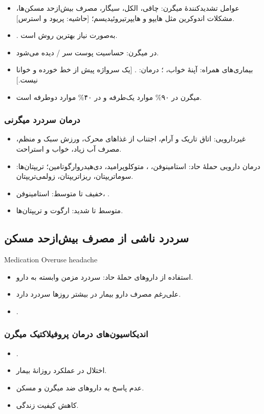 \begin{itemize}
\item عوامل تشدیدکنندهٔ میگرن: چاقی، الکل، سیگار، مصرف بیش‌ازحد مسکن‌ها، مشکلات اندوکرین مثل هایپو و هایپرتیروئیدیسم؛ [حاشیه: پریود و استرس].
\item {}. به‌صورت نیاز بهترین روش  است.
\item در میگرن: حساسیت پوست سر /  دیده می‌شود.
\item بیماری‌های همراه: آپنهٔ خواب، ؛ درمان: . [یک سرواژه پیش از  خط خورده و خوانا نیست.]
\item میگرن در ۹۰\% موارد یک‌طرفه و در ۴۰\% موارد دوطرفه است.
\end{itemize}
\subsubsection{درمان سردرد میگرنی}
\begin{itemize}
\item غیردارویی: اتاق تاریک و آرام، اجتناب از غذاهای محرک، ورزش سبک و منظم، مصرف آب زیاد، خواب و استراحت.
\item درمان دارویی حملهٔ حاد: استامینوفن، ، متوکلوپرامید، دی‌هیدروارگوتامین؛ تریپتان‌ها: سوماتریپتان، ریزاتریپتان، زولمی‌تریپتان.
\item خفیف تا متوسط: استامینوفن، .
\item متوسط تا شدید: ارگوت و تریپتان‌ها.
\end{itemize}
\subsection{سردرد ناشی از مصرف بیش‌ازحد مسکن}
\begin{latin}\noindent Medication Overuse headache\end{latin}
\begin{itemize}
\item استفاده  از داروهای حملهٔ حاد: سردرد مزمن وابسته به دارو.
\item علی‌رغم مصرف دارو بیمار در بیشتر روزها سردرد دارد.
\item {}.
\end{itemize}

\subsubsection{اندیکاسیون‌های درمان پروفیلاکتیک میگرن}
\begin{itemize}
\item {}.
\item اختلال در عملکرد روزانهٔ بیمار.
\item عدم پاسخ به داروهای ضد میگرن و مسکن.
\item کاهش کیفیت زندگی.
\end{itemize}
